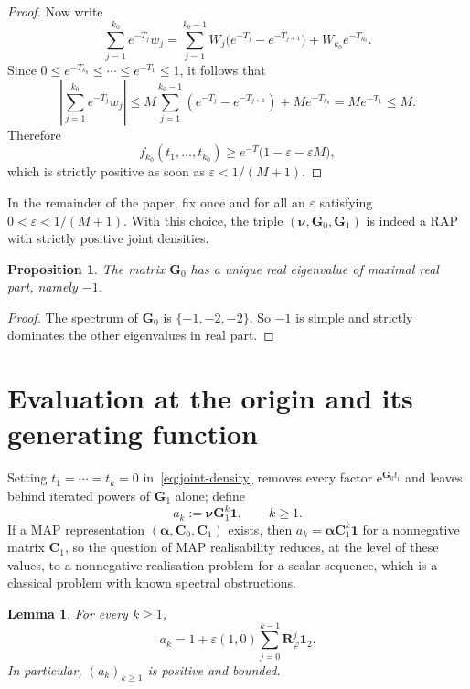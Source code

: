\documentclass[11pt]{article}
\newtheorem{lemma}[theorem]{Lemma}
\newtheorem{proposition}[theorem]{Proposition}
\theoremstyle{definition}
\theoremstyle{remark}
\newcommand{\e}{\mathrm{e}}
\begin{document}
\begin{proof}
Now write
\[
\sum_{j=1}^{k_0} e^{-T_j}w_j
=
\sum_{j=1}^{{k_0}-1}W_j\bigl(e^{-T_j}-e^{-T_{j+1}}\bigr)+W_{k_0}e^{-T_{k_0}}.
\]
Since \(0\le e^{-T_{k_0}}\le\cdots\le e^{-T_1}\le1\), it follows that
\[
\left|\sum_{j=1}^{k_0} e^{-T_j}w_j\right|
\le
M\sum_{j=1}^{{k_0}-1}(e^{-T_j}-e^{-T_{j+1}})+Me^{-T_{k_0}}
=
Me^{-T_1}
\le M.
\]
Therefore
\[
f_{k_0}(t_1,\dots,t_{k_0})\ge e^{-T}\bigl(1-\varepsilon-\varepsilon M\bigr),
\]
which is strictly positive as soon as \(\varepsilon<1/(M+1)\).
\end{proof}

In the remainder of the paper, fix once and for all an $\varepsilon$ satisfying $0<\varepsilon<1/(M+1)$. With this choice, the triple $(\bm{\nu},\bm{G}_0,\bm{G}_1)$ is indeed a RAP with strictly positive joint densities.

\begin{proposition}\label{prop:dominant}
The matrix $\bm{G}_0$ has a unique real eigenvalue of maximal real part, namely $-1$.
\end{proposition}

\begin{proof}
The spectrum of $\bm{G}_0$ is $\{-1,-2,-2\}$.
So $-1$ is simple and strictly dominates the other eigenvalues in real part.
\end{proof}


\section{Evaluation at the origin and its generating function}\label{sec:boundary}


Setting $t_1=\cdots=t_k=0$ in~\eqref{eq:joint-density} removes every factor $\e^{\bm{G}_0t_i}$ and leaves behind iterated powers of $\bm{G}_1$ alone; define
\begin{equation}\label{eq:shadow}
a_k:=\bm{\nu}\bm{G}_1^k\bm{1},
\qquad k\ge 1.
\end{equation}
If a MAP representation $(\bm{\alpha},\bm{C}_0,\bm{C}_1)$ exists, then $a_k=\bm{\alpha}\bm{C}_1^k\bm{1}$ for a nonnegative matrix $\bm{C}_1$, so the question of MAP realisability reduces, at the level of these values, to a nonnegative realisation problem for a scalar sequence, which is a classical problem with known spectral obstructions.

\begin{lemma}\label{lem:shadow}
For every $k\ge 1$,
\begin{equation}\label{eq:shadow-formula}
a_k
=
1+\varepsilon(1,0)\sum_{j=0}^{k-1}\bm{R}_\varphi^j\bm{1}_2.
\end{equation}
In particular, $(a_k)_{k\ge 1}$ is positive and bounded.
\end{lemma}
\end{document}
